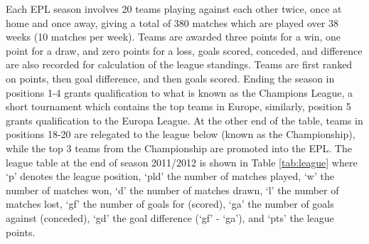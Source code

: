 Each \gls{EPL} season involves 20 teams playing against each other twice, once at home and once away, giving a total of
380 matches which are played over 38 weeks (10 matches per week). Teams are awarded three points for a win, one point
for a draw, and zero points for a loss, goals scored, conceded, and difference are also recorded for calculation of the
league standings. Teams are first ranked on points, then goal difference, and then goals scored. Ending the season in
positions 1-4 grants qualification to what is known as the Champions League, a short tournament which contains the top
teams in Europe, similarly, position 5 grants qualification to the Europa League. At the other end of the table, teams
in positions 18-20 are relegated to the league below (known as the Championship), while the top 3 teams from the
Championship are promoted into the \gls{EPL}. The league table at the end of season 2011/2012 is shown in Table
\ref{tab:league} where `p' denotes the league position, `pld' the number of matches played, `w' the number of matches
won, `d' the number of matches drawn, `l' the number of matches lost, `gf' the number of goals for (scored), `ga' the
number of goals against (conceded), `gd' the goal difference (`gf' - `ga'), and `pts' the league points.
